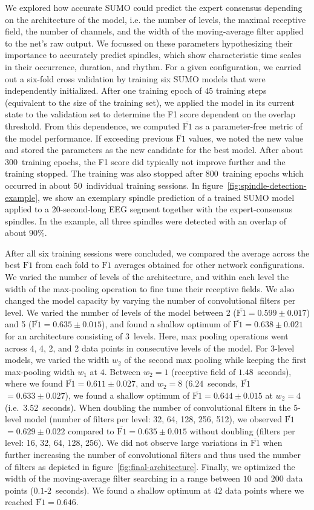 \documentclass[fleqn,twocolumn,10pt]{wlscirep}
\newcommand{\Fmean}{$\overline{\text{F1}}$}
\begin{document}
We explored how accurate SUMO could predict the expert
consensus depending on the architecture of the model, i.e. the number of
levels, the maximal receptive field, the number of channels,
and the width of the moving-average filter applied to the net's raw output.
We focussed on these parameters hypothesizing their importance to accurately
predict spindles, which show characteristic time scales in their occurrence,
duration, and rhythm.
For a given configuration, we carried out a six-fold cross validation by
training six SUMO models that were independently initialized. 
After one training epoch of $45$ training steps 
(equivalent to the size of the training set), we applied the model in its
current state to the validation set to determine the F1 score dependent on the
overlap threshold.  From this dependence, we computed \Fmean{} as a
parameter-free metric of the model performance.  If exceeding previous \Fmean{}
values, we noted the new value and stored the parameters as the new candidate
for the best model.  After about $300$~training epochs, the F1 score did typically not
improve further and the training stopped.  The training was also stopped after
$800$~training epochs which occurred in about $50$~individual training sessions.
In figure~\ref{fig:spindle-detection-example}, we show an exemplary spindle
prediction of a trained SUMO model applied to a 20-second-long EEG segment together
with the expert-consensus spindles.  In the example, all three spindles were
detected with an overlap of about $90\%$.

After all six training sessions were concluded, we compared the average across
the best \Fmean{} from each fold to \Fmean{} averages obtained for other network
configurations.
We varied the number of levels of the architecture, and within each level
the width of the max-pooling operation to fine tune their receptive fields. We
also changed the model capacity by varying the number of convolutional filters
per level.
We varied the number of levels of the model between 2 (\Fmean{}$=0.599\pm0.017$)
and 5 (\Fmean{}$=0.635\pm0.015$), and found a shallow optimum of
\Fmean{}$=0.638\pm0.021$ for an architecture consisting of 3~levels.  Here, max
pooling operations went across 4, 4, 2, and 2 data points in consecutive levels
of the model.
For 3-level models, we varied the width $w_2$ of the second max pooling while
keeping the first max-pooling width $w_1$ at $4$.  Between $w_2=1$ (receptive
field of $1.48$~seconds), where we found \Fmean{}$=0.611\pm0.027$, and $w_2=8$
($6.24$~seconds, \Fmean{}$=0.633\pm0.027$), we found a shallow optimum of
\Fmean{}$=0.644\pm0.015$ at $w_2=4$ (i.e.~$3.52$~seconds).
When doubling the number of convolutional filters in the 5-level model (number
of filters per level: 32, 64, 128, 256, 512), we observed
\Fmean{}$=0.629\pm0.022$ compared to \Fmean{}$=0.635\pm0.015$ without doubling
(filters per level: 16, 32, 64, 128, 256). We did not observe large variations
in \Fmean{} when further increasing the number of convolutional filters and thus
used the number of filters as depicted in figure~\ref{fig:final-architecture}.
Finally, we optimized the width of the moving-average filter searching in a range
between $10$ and $200$ data points ($0.1$-$2$~seconds).  We found a shallow
optimum at $42$ data points where we reached \Fmean{}$=0.646$.
\end{document}
